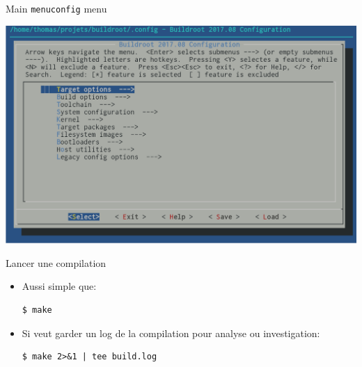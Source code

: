 \begin{frame}{Main {\tt menuconfig} menu}
  \begin{center}
    \includegraphics[height=0.8\textheight]{pictures/menuconfig.png}
  \end{center}
\end{frame}

\begin{frame}[fragile]{Lancer une compilation}
  \begin{itemize}
  \item Aussi simple que:
    \begin{block}{}
\begin{verbatim}
$ make
\end{verbatim}
    \end{block}
  \item Si veut garder un log de la compilation pour analyse ou investigation:
    \begin{block}{}
\begin{verbatim}
$ make 2>&1 | tee build.log
\end{verbatim}
    \end{block}
  \end{itemize}
\end{frame}

